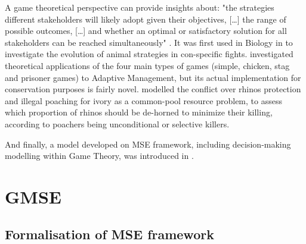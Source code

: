 \documentclass[12pt,a4paper]{article}
\begin{document}
A game theoretical perspective can provide insights about: "the strategies different stakeholders will likely adopt given their objectives, [\dots] the range of possible outcomes, [\dots] and whether an optimal or satisfactory solution for all stakeholders can be reached simultaneously" \citep{COLYVAN20111246}.
It was first used in Biology in \cite{maynard1973logic} to investigate the evolution of animal strategies in con-specific fights.
\cite{COLYVAN20111246} investigated theoretical applications of the four main types of games (simple, chicken, stag and prisoner games) to Adaptive Management, but its actual implementation for conservation purposes is fairly novel. %
\cite{glynatsi2018evolutionary} modelled the conflict over rhinos protection and illegal poaching for ivory as a common-pool resource problem, to assess which proportion of rhinos should be de-horned to minimize their killing, according to poachers being unconditional or selective killers. %

And finally, a model developed on MSE framework, including decision-making modelling within Game Theory, was introduced in \cite{duthie2018}.

\section{GMSE}%

\subsection{Formalisation of MSE framework}
\end{document}
